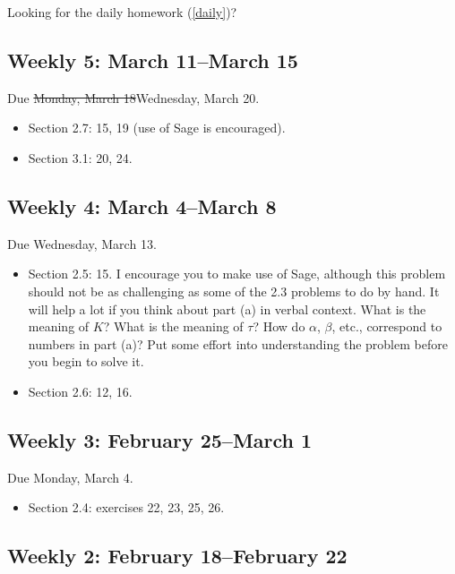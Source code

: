 Looking for the daily homework (\autoref{daily})?

\subsection{Weekly 5: March 11--March 15}
\label{weekly5:march11--march15}

Due \sout{Monday, March 18}Wednesday, March 20.

\begin{itemize}
\item Section 2.7: 15, 19 (use of Sage is encouraged).

\item Section 3.1: 20, 24.

\end{itemize}

\subsection{Weekly 4: March 4--March 8}
\label{weekly4:march4--march8}

Due Wednesday, March 13.

\begin{itemize}
\item Section 2.5: 15. I encourage you to make use of Sage, although this problem should not be as challenging as some of the 2.3 problems to do by hand. It will help a lot if you think about part (a) in verbal context. What is the meaning of $K$? What is the meaning of $\tau$? How do $\alpha$, $\beta$, etc., correspond to numbers in part (a)? Put some effort into understanding the problem before you begin to solve it.

\item Section 2.6: 12, 16.

\end{itemize}

\subsection{Weekly 3: February 25--March 1}
\label{weekly3:february25--march1}

Due Monday, March 4.

\begin{itemize}
\item Section 2.4: exercises 22, 23, 25, 26.

\end{itemize}

\subsection{Weekly 2: February 18--February 22}
\label{weekly2:february18--february22}

